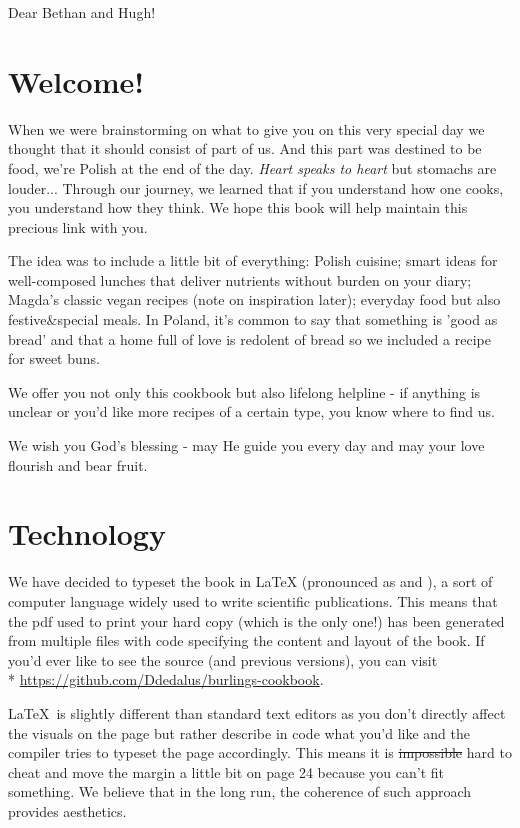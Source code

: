
Dear Bethan and Hugh!

\section*{Welcome!}
When we were brainstorming on what to give you on this very special day we thought that it should consist of part of us.
And this part was destined to be food, we're Polish at the end of the day.
\textit{Heart speaks to heart} but stomachs are louder...
Through our journey, we learned that if you understand how one cooks, you understand how they think.
We hope this book will help maintain this precious link with you.

The idea was to include a little bit of everything: Polish cuisine;
smart ideas for well-composed lunches that deliver nutrients without burden on your diary;
Magda's classic vegan recipes (note on inspiration later);
everyday food but also festive\&special meals.
In Poland, it's common to say that something is 'good as bread' and that a home full of love is redolent of bread so we included a recipe for sweet buns.

We offer you not only this cookbook but also lifelong helpline - if anything is unclear or you'd like more recipes of a certain type,
you know where to find us.

We wish you God's blessing - may He guide you every day and may your love flourish and bear fruit.

\section*{Technology}
We have decided to typeset the book in \LaTeX{} (pronounced as  and ),
a sort of computer language widely used to write scientific publications.
This means that the pdf used to print your hard copy (which is the only one!)
has been generated from multiple files with code specifying the content and layout
of the book.
If you'd ever like to see the source (and previous versions),
you can visit
\\*
\underline{https://github.com/Ddedalus/burlings-cookbook}.

\LaTeX{}~is slightly different than standard text editors as you don't directly affect the visuals
on the page but rather describe in code what you'd like and the compiler tries to
typeset the page accordingly.
This means it is \sout{impossible} hard to cheat and
move the margin a little bit on page 24 because you can't fit something.
We believe that in the long run, the coherence of such approach provides aesthetics.

